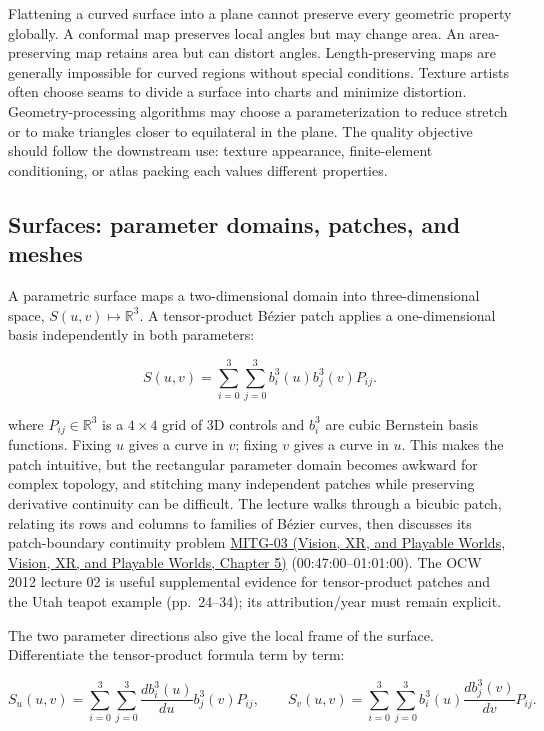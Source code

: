 Flattening a curved surface into a plane cannot preserve every geometric property globally. A conformal map preserves local angles but may change area. An area-preserving map retains area but can distort angles. Length-preserving maps are generally impossible for curved regions without special conditions. Texture artists often choose seams to divide a surface into charts and minimize distortion. Geometry-processing algorithms may choose a parameterization to reduce stretch or to make triangles closer to equilateral in the plane. The quality objective should follow the downstream use: texture appearance, finite-element conditioning, or atlas packing each values different properties.

\subsection{Surfaces: parameter domains, patches, and meshes}\label{03-visual-computing-i-ch002-surfaces-parameter-domains-patches-and-meshes}

A parametric surface maps a two-dimensional domain into three-dimensional space, \(S(u,v)\mapsto\mathbb R^3\). A tensor-product Bézier patch applies a one-dimensional basis independently in both parameters:

\[
S(u,v)=\sum_{i=0}^{3}\sum_{j=0}^{3} b_i^3(u)b_j^3(v)P_{ij}.
\]

where \(P_{ij}\in\mathbb{R}^3\) is a \(4\times4\) grid of 3D controls and \(b_i^3\) are cubic Bernstein basis functions. Fixing \(u\) gives a curve in \(v\); fixing \(v\) gives a curve in \(u\). This makes the patch intuitive, but the rectangular parameter domain becomes awkward for complex topology, and stitching many independent patches while preserving derivative continuity can be difficult. The lecture walks through a bicubic patch, relating its rows and columns to families of Bézier curves, then discusses its patch-boundary continuity problem \href{../07-Vision-XR-and-Playable-Worlds/main.pdf\#nameddest=04-visual-computing-ii-ch036-mitg-03---curves-and-surfaces}{MITG-03 (Vision, XR, and Playable Worlds, Vision, XR, and Playable Worlds, Chapter 5)} (00:47:00--01:01:00). The OCW 2012 lecture 02 is useful supplemental evidence for tensor-product patches and the Utah teapot example (pp.~24--34); its attribution/year must remain explicit.

The two parameter directions also give the local frame of the surface. Differentiate the tensor-product formula term by term:

\[
S_u(u,v)=\sum_{i=0}^{3}\sum_{j=0}^{3}\frac{d b_i^3(u)}{du}b_j^3(v)P_{ij},\qquad
S_v(u,v)=\sum_{i=0}^{3}\sum_{j=0}^{3}b_i^3(u)\frac{d b_j^3(v)}{dv}P_{ij}.
\]

